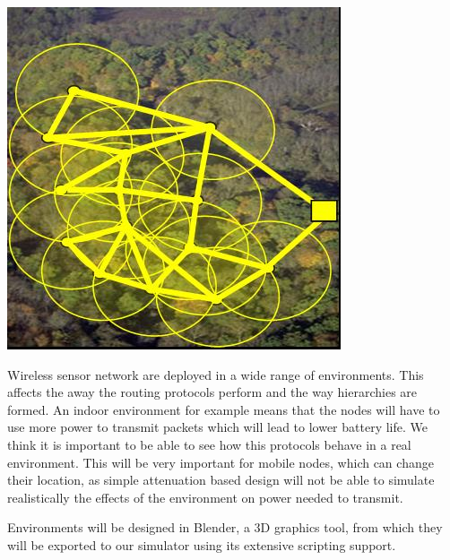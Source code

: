 \begin{center}
	\includegraphics{img/env.jpg}
\end{center}

Wireless sensor network are deployed in a wide range of environments. This affects
the away the routing protocols perform and the way hierarchies are formed. An indoor
environment for example means that the nodes will have to use more power to transmit
packets which will lead to lower battery life. We think it is important to be able to
see how this protocols behave in a real environment. This will be very important for
mobile nodes, which can change their location, as simple attenuation based design will
not be able to simulate realistically the effects of the environment on power needed to
transmit.

Environments will be designed in Blender, a 3D graphics tool, from which they will be
exported to our simulator using its extensive scripting support. 
